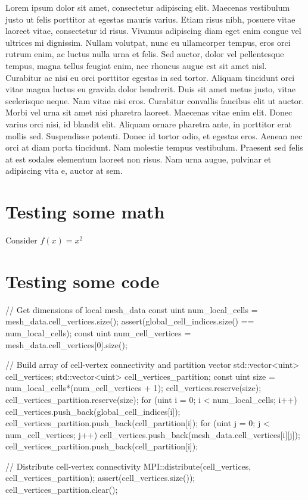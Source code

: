 \documentclass{ansarticle}
\begin{document}
Lorem ipsum dolor sit amet, consectetur adipiscing elit. Maecenas
vestibulum justo ut felis porttitor at egestas mauris varius. Etiam
risus nibh, posuere vitae laoreet vitae, consectetur id risus. Vivamus
adipiscing diam eget enim congue vel ultrices mi dignissim. Nullam
volutpat, nunc eu ullamcorper tempus, eros orci rutrum enim, ac luctus
nulla urna et felis. Sed auctor, dolor vel pellentesque tempus, magna
tellus feugiat enim, nec rhoncus augue est sit amet nisl. Curabitur ac
nisi eu orci porttitor egestas in sed tortor. Aliquam tincidunt orci
vitae magna luctus eu gravida dolor hendrerit. Duis sit amet metus
justo, vitae scelerisque neque. Nam vitae nisi eros. Curabitur
convallis faucibus elit ut auctor. Morbi vel urna sit amet nisi
pharetra laoreet. Maecenas vitae enim elit. Donec varius orci nisi, id
blandit elit. Aliquam ornare pharetra ante, in porttitor erat mollis
sed. Suspendisse potenti. Donec id tortor odio, et egestas
eros. Aenean nec orci at diam porta tincidunt. Nam molestie tempus
vestibulum. Praesent sed felis at est sodales elementum laoreet non
risus. Nam urna augue, pulvinar et adipiscing vita
e, auctor at sem.

\section{Testing some math}

Consider $f(x) = x^2$

\section{Testing some code}

\begin{c++}
// Get dimensions of local mesh_data
const uint num_local_cells = mesh_data.cell_vertices.size();
assert(global_cell_indices.size() == num_local_cells);
const uint num_cell_vertices = mesh_data.cell_vertices[0].size();

// Build array of cell-vertex connectivity and partition vector
std::vector<uint> cell_vertices;
std::vector<uint> cell_vertices_partition;
const uint size = num_local_cells*(num_cell_vertices + 1);
cell_vertices.reserve(size);
cell_vertices_partition.reserve(size);
for (uint i = 0; i < num_local_cells; i++)
{
  cell_vertices.push_back(global_cell_indices[i]);
  cell_vertices_partition.push_back(cell_partition[i]);
  for (uint j = 0; j < num_cell_vertices; j++)
  {
    cell_vertices.push_back(mesh_data.cell_vertices[i][j]);
    cell_vertices_partition.push_back(cell_partition[i]);
  }
}

// Distribute cell-vertex connectivity
MPI::distribute(cell_vertices, cell_vertices_partition);
assert(cell_vertices.size());
cell_vertices_partition.clear();
\end{c++}
\end{document}
